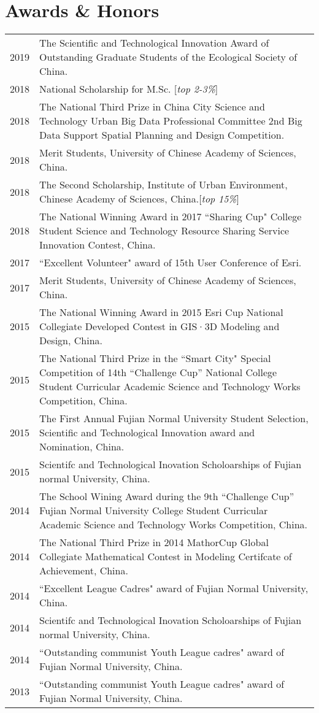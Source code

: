 \section*{Awards \& Honors}

\begin{tabular}{p{} p{}}
2019 & The Scientific and Technological Innovation Award of Outstanding Graduate Students of the Ecological Society of China. \\
2018 & National Scholarship for M.Sc. [\textit{top 2-3\%}] \\
2018 & The National Third Prize in China City Science and Technology Urban Big Data Professional Committee 2nd Big Data Support Spatial Planning and Design Competition. \\
2018 & Merit Students, University of Chinese Academy of Sciences, China.\\
2018 & The Second Scholarship, Institute of Urban Environment, Chinese Academy of Sciences, China.[\textit{top 15\%}] \\
2018 & The National Winning Award in 2017 ``Sharing Cup" College Student Science and Technology Resource Sharing Service Innovation Contest, China.\\
2017 & ``Excellent Volunteer" award of 15th User Conference of Esri. \\
2017 & Merit Students, University of Chinese Academy of Sciences, China. \\
2015 & The National Winning Award in 2015 Esri Cup National Collegiate Developed Contest in GIS·3D Modeling and Design, China.\\
2015 & The National Third Prize in the ``Smart City" Special Competition of 14th “Challenge Cup” National College Student Curricular Academic Science and Technology Works Competition, China.\\
2015 & The First Annual Fujian Normal University Student Selection, Scientific and Technological Innovation award and Nomination, China.\\
2015 & Scientifc and Technological Inovation Scholoarships of Fujian normal University, China.\\
2014 & The School Wining Award during the 9th “Challenge Cup” Fujian Normal University College Student Curricular Academic Science and Technology Works Competition, China.\\
2014 & The National Third Prize in 2014 MathorCup Global Collegiate Mathematical Contest in Modeling Certifcate of Achievement, China.\\
2014 & ``Excellent League Cadres" award of Fujian Normal University, China.\\
2014 & Scientifc and Technological Inovation Scholoarships of Fujian normal University, China.\\
2014 & ``Outstanding communist Youth League cadres" award of Fujian Normal University, China.\\
2013 & ``Outstanding communist Youth League cadres" award of Fujian Normal University, China.\\
\end{tabular}

